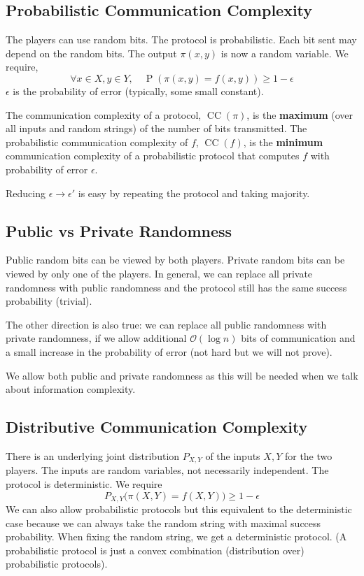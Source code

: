 \documentclass{article}
\begin{document}
\subsection{Probabilistic Communication Complexity}

The players can use random bits. The protocol is probabilistic. Each bit sent may depend on the random bits. The output $\pi(x,y)$ is now a random variable. We require,
\[
\forall x\in X, y\in Y, \quad \operatorname{P}(\pi(x,y)=f(x,y)) \geq 1-\epsilon
\]
$\epsilon$ is the probability of error (typically, some small constant).

The communication complexity of a protocol, $\operatorname{CC}(\pi)$, is the \textbf{maximum} (over all inputs and random strings) of the number of bits transmitted. The probabilistic communication complexity of $f$, $\operatorname{CC}(f)$, is the \textbf{minimum} communication complexity of a probabilistic protocol that computes $f$ with probability of error $\epsilon$.

Reducing $\epsilon\to \epsilon'$ is easy by repeating the protocol and taking majority.

\subsection{Public vs Private Randomness}

Public random bits can be viewed by both players. Private random bits can be viewed by only one of the players. In general, we can replace all private randomness with public randomness and the protocol still has the same success probability (trivial).

The other direction is also true: we can replace all public randomness with private randomness, if we allow additional $\mathcal{O}\left(\log n\right)$ bits of communication and a small increase in the probability of error (not hard but we will not prove).

We allow both public and private randomness as this will be needed when we talk about information complexity.

\subsection{Distributive Communication Complexity}

There is an underlying joint distribution $P_{X,Y}$ of the inputs $X,Y$ for the two players. The inputs are random variables, not necessarily independent. The protocol is deterministic. We require 
\[
P_{X,Y} \big(\pi\left(X,Y\right) = f(X,Y)\big)\geq 1-\epsilon
\]
We can also allow probabilistic protocols but this equivalent to the deterministic case because we can always take the random string with maximal success probability. When fixing the random string, we get a deterministic protocol. (A probabilistic protocol is just a convex combination (distribution over) probabilistic protocols).
\end{document}
